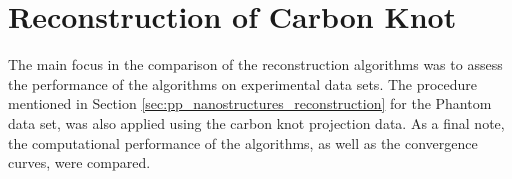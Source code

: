 \section{Reconstruction of Carbon Knot}


The main focus in the comparison of the reconstruction algorithms was to assess the performance of the algorithms on experimental data sets.
The procedure mentioned in Section \ref{sec:pp_nanostructures_reconstruction} for the Phantom data set, was also applied using the carbon knot projection data.
As a final note, the computational performance of the algorithms, as well as the convergence curves, were compared.